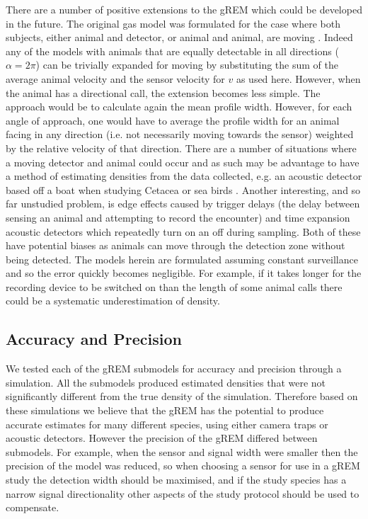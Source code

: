 \documentclass[a4paper,10pt,reqno,oneside]{amsart}
\begin{document}
There are a number of positive extensions to the gREM which could be developed in the future. The original gas model was formulated for the case where both subjects, either animal and detector, or animal and animal, are moving \citep{Hutchinson_Waser_2007}. Indeed any of the models with animals that are equally detectable in all directions ($\alpha = 2\pi$) can be trivially expanded for moving by substituting the sum of the average animal velocity and the sensor velocity for $v$ as used here. However, when the animal has a directional call, the extension becomes less simple. The approach would be to calculate again the mean profile width. However, for each angle of approach, one would have to average the profile width for an animal facing in any direction (i.e. not necessarily moving towards the sensor) weighted by the relative velocity of that direction. There are a number of situations where a moving detector and animal could occur and as such may be advantage to have a method of estimating densities from the data collected, e.g. an acoustic detector based off a boat when studying Cetacea or sea birds \citep{yack2013passive}. Another interesting, and so far unstudied problem, is edge effects caused by trigger delays (the delay between sensing an animal and attempting to record the encounter) and time expansion acoustic detectors which repeatedly turn on an off during sampling. Both of these have potential biases as animals can move through the detection zone without being detected. The models herein are formulated assuming constant surveillance and so the error quickly becomes negligible. For example, if it takes longer for the recording device to be switched on than the length of some animal calls there could be a systematic underestimation of density.


\subsection{Accuracy and Precision}
We tested each of the gREM submodels for accuracy and precision through a simulation. All the submodels produced estimated densities that were not significantly different from the true density of the simulation. Therefore based on these simulations we believe that the gREM has the potential to produce accurate estimates for many different species, using either camera traps or acoustic detectors. However the precision of the gREM differed between submodels. For example, when the sensor and signal width were smaller then the precision of the model was reduced, so when choosing a sensor for use in a gREM study the detection width should be maximised, and if the study species has a narrow signal directionality other aspects of the study protocol should be used to compensate. 
\end{document}
